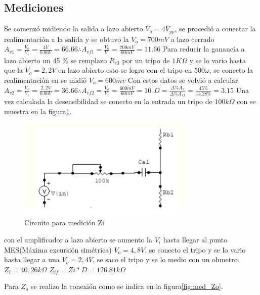 \documentclass[12pt, letterpaper]{article}
\begin{document}
\subsection{Mediciones}
Se comenzó midiendo la salida a lazo abierto $V_o=4V_{pp}$, se procedió a conectar la realimentación a la salida y se obtuvo la $V_o=700mV$ a lazo cerrado
\singlespacing
$A_{v1}=\frac{V_o}{V_{i}}=\frac{4V}{0.06V}=66.66 \therefore A_{vf1}=\frac{V_o}{V_{i}}=\frac{700mV}{60mV}=11.66$
\singlespacing
Para reducir la ganancia a lazo abierto un 45 \% se remplazo $R_{e3}$ por un tripo de $1K\Omega$ y se lo vario hasta que la $V_o=2,2V$ en lazo abierto esto se logro con el tripo en $500\omega$, se conecto la realimentación en se midió $V_o=600mv$
\singlespacing
Con estos datos se volvió a calcular $A_{v2}=\frac{V_o}{V_{i}}=\frac{2,2V}{0.06V}=36.66 \therefore A_{vf2}=\frac{V_o}{V_{i}}=\frac{600mV}{60mV}=10$
\singlespacing
$D=\frac{\Delta \% A_v}{\Delta \% A_{vf}}=\frac{45\%}{14.28\%}=3.15$
\singlespacing
Una vez calculada la desensibilidad se conecto en la entrada un tripo de $100k\Omega$ con se muestra en la figura\ref{fig:med_Zi}.
\singlespacing
\begin{figure}[H]
	\centering
	\includegraphics[width=0.75\textwidth]{Imagenes/zi.png}
	\caption{Circuito para medición Zi}
	\label{fig:med_Zi}
\end{figure}
con el amplificador a lazo abierto se aumento la $V_i$ hasta llegar al punto MES(Máxima excursión simétrica) $V_o=4,8V$, se conecto el tripo y se lo vario hasta llegar a una $V_o=2,4V$, se saco el tripo y se lo medio con un ohmetro.
\singlespacing
$Z_i=40,26k\Omega$
$Z_{if}=Zi*D=126.81k\Omega$
\singlespacing

Para $Z_o$ se realizo la conexión como se indica en la figura\ref{fig:med_Zo}.
\end{document}
